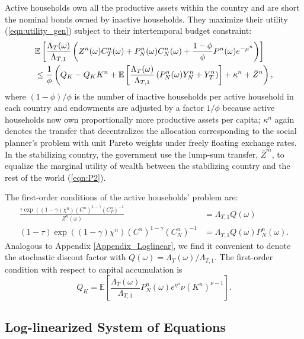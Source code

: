 Active households own all the productive assets within the country and
are short the nominal bonds owned by inactive households. They
maximize their utility (\ref{eqn:utility_gen}) subject to their
intertemporal budget constraint:
\begin{align}
  & \mathbb{E}\left[ \frac{\Lambda_T (\omega)}{\Lambda_{T, 1}} \left(
    Z^n(\omega) C^n_T(\omega) + P^n_N(\omega) C^n_N(\omega)
    + \frac{1 - \phi}{\phi} P^n(\omega) e^{- \mu^n}
    \right) \right] \label{eqn:bc_peg_full}  \\
  & \le \frac{1}{\phi} \left( Q_K - Q_K K^n
    + \mathbb{E}\left[ \frac{\Lambda_T (\omega)}{\Lambda_{T, 1}}
    \left( P^n_N(\omega) Y^n_N + Y^n_T \right) \right] +
    \kappa^n  + \bar{Z}^n \right), \notag
\end{align}
where $(1 - \phi) / \phi$ is the number of inactive households per
active household in each country and endowments are adjusted by a
factor $1 / \phi$ because active households now own proportionally
more productive assets per capita; \(\kappa^n \) again denotes the
transfer that decentralizes the allocation corresponding to the social
planner's problem with unit Pareto weights under freely floating
exchange rates. In the stabilizing country, the government use the
lump-sum transfer, $\bar{Z}^m$, to equalize the marginal utility of
wealth between the stabilizing country and the rest of the world
(\ref{eqn:P2}).

The first-order conditions of the active households' problem are:
\begin{align}
  \frac{\tau \exp( (1 - \gamma) \chi^n) \left( C^n \right)^{1 - \gamma} \left( C_T^n \right)^{-1}}{Z^n(\omega)}
  &= \Lambda_{T, 1} Q(\omega) \label{eqn:FOCCT_full_gen}\\ 
  (1 - \tau) \exp( (1 - \gamma) \chi^n) \left( C^n \right)^{1 - \gamma} \left( C_N^n \right)^{-1}
  &= \Lambda_{T, 1} Q(\omega) P_N^n(\omega) \label{eqn:FOCCN_full_gen}.
\end{align}
Analogous to Appendix \eqref{Appendix_Loglinear}, we find it
convenient to denote the stochastic discout factor with
$Q(\omega) = \Lambda_T(\omega) / \Lambda_{T, 1}$. The first-order
condition with respect to capital accumulation is
\begin{equation}
  Q_K  = \mathbb{E} \left[
    \frac{\Lambda_T (\omega)}{\Lambda_{T, 1}}
    P_N^n(\omega) e^{\eta^n} \nu \left( K^n \right)^{\nu - 1} 
  \right].
  \label{eqn:FOCK_full_gen}
\end{equation}

\subsection{Log-linearized System of
  Equations \label{Appendix_Loglinear_FullModel}}

